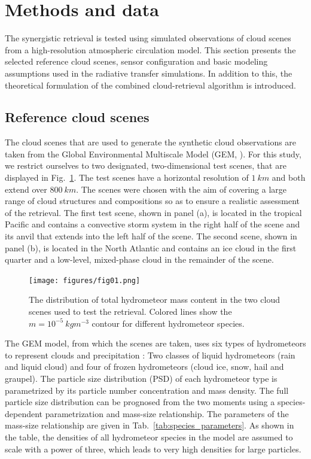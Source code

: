 \documentclass[journal abbreviation, manuscript]{copernicus}
\begin{document}
\section{Methods and data}
\label{sec:methods_and_data}

The synergistic retrieval is tested using simulated observations of cloud scenes
from a high-resolution atmospheric circulation model. This section presents the
selected reference cloud scenes, sensor configuration and basic modeling
assumptions used in the radiative transfer simulations. In addition to this, the
theoretical formulation of the combined cloud-retrieval algorithm is introduced.

\subsection{Reference cloud scenes}

The cloud scenes that are used to generate the synthetic cloud observations are
taken from the Global Environmental Multiscale Model (GEM, \cite{cote98}). For
this study, we restrict ourselves to two designated, two-dimensional test
scenes, that are displayed in Fig.~\ref{fig:overview}. The test scenes have a
horizontal resolution of $1\ \unit{km}$ and both extend over $800\ \unit{km}$.
The scenes were chosen with the aim of covering a large range of cloud
structures and compositions so as to ensure a realistic assessment of the
retrieval. The first test scene, shown in panel (a), is located in the tropical
Pacific and contains a convective storm system in the right half of the scene
and its anvil that extends into the left half of the scene. The second scene,
shown in panel (b), is located in the North Atlantic and contains an  ice
cloud in the first quarter and a low-level, mixed-phase cloud in the remainder
of the scene.

\begin{figure}[h!]
\centering
\texttt{[image: figures/fig01.png]}
\caption{The distribution of total hydrometeor mass content in the two
cloud scenes used to test the retrieval. Colored lines show the
 $m = 10^{-5}\  \unit{kg m^{-3}}$ contour for different
 hydrometeor species.}
\label{fig:overview}
\end{figure}


The GEM model, from which the scenes are taken, uses six types of hydrometeors
to represent clouds and precipitation \citep{milbrandtyau05}: Two classes of
liquid hydrometeors (rain and liquid cloud) and four of frozen hydrometeors
(cloud ice, snow, hail and graupel). The particle size distribution (PSD) of
each hydrometeor type is parametrized by its particle number concentration and
mass density. The full particle size distribution can be prognosed from the two
moments using a species-dependent parametrization and mass-size relationship.
The parameters of the mass-size relationship are given in
Tab.~\ref{tab:species_parameters}. As shown in the table, the densities of all
hydrometeor species in the model are assumed to scale with a power of three,
which leads to very high densities for large particles.
\end{document}
